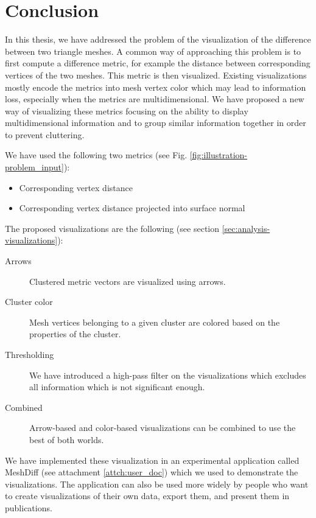 \chapter*{Conclusion}

In this thesis, we have addressed the problem of the visualization of the difference between two triangle meshes. A common way of approaching this problem is to first compute a difference metric, for example the distance between corresponding vertices of the two meshes. This metric is then visualized. Existing visualizations mostly encode the metrics into mesh vertex color which may lead to information loss, especially when the metrics are multidimensional. We have proposed a new way of visualizing these metrics focusing on the ability to display multidimensional information and to group similar information together in order to prevent cluttering.

We have used the following two metrics (see Fig. \ref{fig:illustration-problem_input}):

\begin{itemize}
	\item Corresponding vertex distance	
	\item Corresponding vertex distance projected into surface normal
\end{itemize}

The proposed visualizations are the following (see section \ref{sec:analysis-visualizations}):

\begin{description}
	\item [Arrows] Clustered metric vectors are visualized using arrows.
	\item [Cluster color] Mesh vertices belonging to a given cluster are colored based on the properties of the cluster.
	\item [Thresholding] We have introduced a high-pass filter on the visualizations which excludes all information which is not significant enough.
	\item [Combined] Arrow-based and color-based visualizations can be combined to use the best of both worlds.
\end{description}

We have implemented these visualization in an experimental application called MeshDiff (see attachment \ref{attch:user_doc}) which we used to demonstrate the visualizations. The application can also be used more widely by people who want to create visualizations of their own data, export them, and present them in publications.

